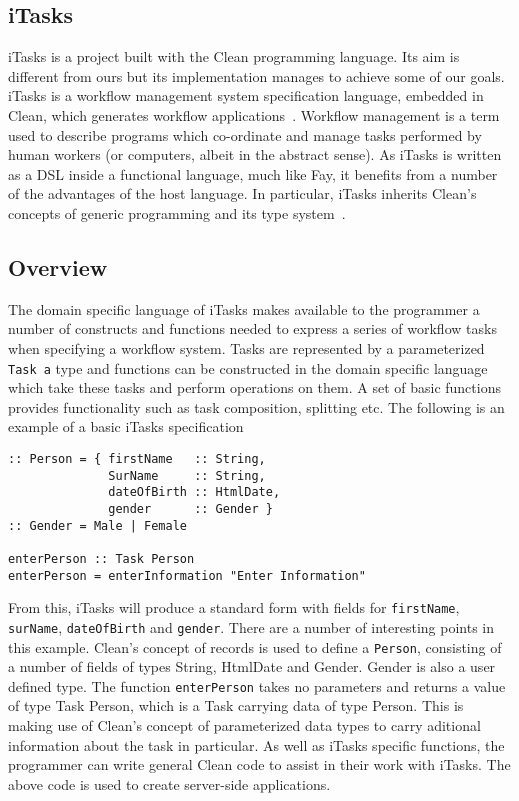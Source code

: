 \subsection{iTasks}
iTasks is a project built with the Clean programming language. Its aim
is different from ours but its implementation manages to achieve some of
our goals. iTasks is a workflow management system specification language,
embedded in Clean, which generates workflow applications~\cite{iTasks}. Workflow management
is a term used to describe programs which co-ordinate and manage tasks
performed by human workers (or computers, albeit in the abstract sense).
As iTasks is written as a DSL inside a functional language, much like Fay, 
it benefits from a
number of the advantages of the host language. In particular, iTasks inherits
Clean's concepts of generic programming and its type system~\cite[pp.9]{iTasks}. 

\subsection{Overview}
The domain specific language of iTasks makes available to the programmer a
number of constructs and functions needed to express a series of workflow
tasks when specifying a workflow system. Tasks are represented by a 
parameterized \verb!Task a!
type and functions can be constructed in the domain specific language which
take these tasks and perform operations on them. A set of basic functions
provides functionality such as task composition, splitting etc. The following
is an example of a basic iTasks specification

\begin{verbatim}
:: Person = { firstName   :: String, 
              SurName     :: String,
              dateOfBirth :: HtmlDate,
              gender      :: Gender }
:: Gender = Male | Female

enterPerson :: Task Person
enterPerson = enterInformation "Enter Information"
\end{verbatim}

From this, iTasks will produce a standard form with fields for \verb!firstName!, 
\verb!surName!, \verb!dateOfBirth! and \verb!gender!. There are a number of interesting points
in this example. Clean's concept of records is used to define a \verb!Person!,
consisting of a number of fields of types String, HtmlDate and Gender. 
Gender is also a user defined type. The function \verb!enterPerson! takes no
parameters and returns a value of type Task Person, which is a Task
carrying data of type Person. This is making use of Clean's concept 
of parameterized data types to carry aditional information about the 
task in particular. As well as iTasks specific functions, the programmer
can write general Clean code to assist in their work with iTasks.
The above code is used to create server-side applications.

